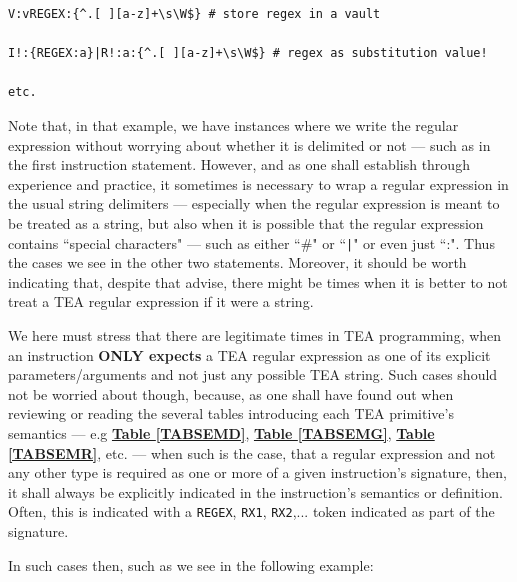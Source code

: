 \documentclass[a4paper, 18pt]{book} %
\begin{document}
{{{\begin{appendices}
\begin{tcolorbox}[teaterminalstyle, title=TEA Regular Expressions: Example 1: Handling Literal Regexs in Place of TEA Strings, breakable]
\begin{lstlisting}[language=TEA,breaklines=true,]
V:vREGEX:{^.[ ][a-z]+\s\W$} # store regex in a vault

I!:{REGEX:a}|R!:a:{^.[ ][a-z]+\s\W$} # regex as substitution value!

etc.
   \end{lstlisting}
  \end{tcolorbox}

\vspace{2em}

Note that, in that example, we have instances where we write the regular expression without worrying about whether it is delimited or not --- such as in the first instruction statement. However, and as one shall establish through experience and practice, it sometimes is necessary to wrap a regular expression in the usual string delimiters --- especially when the regular expression is meant to be treated as a string, but also when it is possible that the regular expression contains ``special characters" --- such as either ``\#" or ``\verb$|$" or even just ``:". Thus the cases we see in the other two statements. Moreover, it should be worth indicating that, despite that advise, there might be times when it is better to not treat a TEA regular expression if it were a string.

\vspace{2em}

We here must stress that there are legitimate times in TEA programming, when an instruction \textbf{ONLY expects} a TEA regular expression as one of its explicit parameters/arguments and not just any possible TEA string. Such cases should not be worried about though, because, as one shall have found out when reviewing or reading the several tables introducing each TEA primitive's semantics --- e.g \textbf{\hyperref[TABSEMD]{Table \ref{TABSEMD}}}, \textbf{\hyperref[TABSEMG]{Table \ref{TABSEMG}}}, \textbf{\hyperref[TABSEMR]{Table \ref{TABSEMR}}}, etc. --- when such is the case, that a regular expression and not any other type is required as one or more of a given instruction's signature, then, it shall always be explicitly indicated in the instruction's semantics or definition. Often, this is indicated with a \texttt{REGEX}, \texttt{RX1}, \texttt{RX2},... token indicated as part of the signature.

\vspace{2em}

In such cases then, such as we see in the following example:

\vspace{2em}


\end{appendices}}}}
\end{document}
